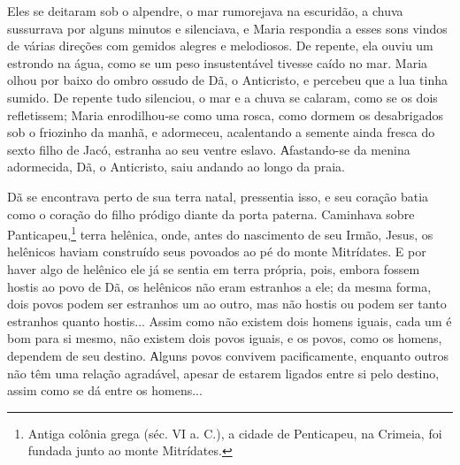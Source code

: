 Eles se deitaram sob o alpendre, o mar rumorejava na escuridão, a chuva
sussurrava por alguns minutos e silenciava, e Maria respondia a esses
sons vindos de várias direções com gemidos alegres e melodiosos. De
repente, ela ouviu um estrondo na água, como se um peso insustentável
tivesse caído no mar. Maria olhou por baixo do ombro ossudo de Dã, o
Anticristo, e percebeu que a lua tinha sumido. De repente tudo
silenciou, o mar e a chuva se calaram, como se os dois refletissem;
Maria enrodilhou-se como uma rosca, como dormem os desabrigados sob o
friozinho da manhã, e adormeceu, acalentando a semente ainda fresca do
sexto filho de Jacó, estranha ao seu ventre eslavo. Аfastando-se da
menina adormecida, Dã, o Anticristo, saiu andando ao longo da praia.

Dã se encontrava perto de sua terra natal, pressentia isso, e seu
coração batia como o coração do filho pródigo diante da porta paterna.
Caminhava sobre Panticapeu,\footnote{Antiga colônia grega (séc. VI a.
  C.), a cidade de Penticapeu, na Crimeia, foi fundada junto ao monte
  Mitrídates.} terra helênica, onde, antes do nascimento de seu Irmão,
Jesus, os helênicos haviam construído seus povoados ao pé do monte
Mitrídates. E por haver algo de helênico ele já se sentia em terra
própria, pois, embora fossem hostis ao povo de Dã, os helênicos não eram
estranhos a ele; da mesma forma, dois povos podem ser estranhos um ao
outro, mas não hostis ou podem ser tanto estranhos quanto hostis...
Assim como não existem dois homens iguais, cada um é bom para si mesmo,
não existem dois povos iguais, e os povos, como os homens, dependem de
seu destino. Аlguns povos convivem pacificamente, enquanto outros não
têm uma relação agradável, apesar de estarem ligados entre si pelo
destino, assim como se dá entre os homens...

